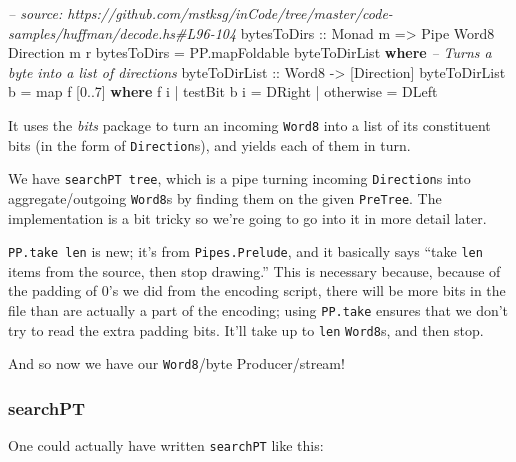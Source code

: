 \documentclass[]{article}
\newenvironment{Shaded}{}{}
\newcommand{\KeywordTok}[1]{\textcolor[rgb]{0.00,0.44,0.13}{\textbf{{#1}}}}
\newcommand{\DataTypeTok}[1]{\textcolor[rgb]{0.56,0.13,0.00}{{#1}}}
\newcommand{\DecValTok}[1]{\textcolor[rgb]{0.25,0.63,0.44}{{#1}}}
\newcommand{\CommentTok}[1]{\textcolor[rgb]{0.38,0.63,0.69}{\textit{{#1}}}}
\newcommand{\OtherTok}[1]{\textcolor[rgb]{0.00,0.44,0.13}{{#1}}}
\newcommand{\FunctionTok}[1]{\textcolor[rgb]{0.02,0.16,0.49}{{#1}}}
\newcommand{\NormalTok}[1]{{#1}}
\begin{document}
\begin{Shaded}
\begin{Highlighting}[]
\CommentTok{-- source: https://github.com/mstksg/inCode/tree/master/code-samples/huffman/decode.hs#L96-104}
\OtherTok{bytesToDirs ::} \DataTypeTok{Monad} \NormalTok{m }\OtherTok{=>} \DataTypeTok{Pipe} \DataTypeTok{Word8} \DataTypeTok{Direction} \NormalTok{m r}
\NormalTok{bytesToDirs }\FunctionTok{=} \NormalTok{PP.mapFoldable byteToDirList}
  \KeywordTok{where}
    \CommentTok{-- Turns a byte into a list of directions}
\OtherTok{    byteToDirList ::} \DataTypeTok{Word8} \OtherTok{->} \NormalTok{[}\DataTypeTok{Direction}\NormalTok{]}
    \NormalTok{byteToDirList b }\FunctionTok{=} \NormalTok{map f [}\DecValTok{0}\FunctionTok{..}\DecValTok{7}\NormalTok{]}
      \KeywordTok{where}
        \NormalTok{f i }\FunctionTok{|} \NormalTok{testBit b i }\FunctionTok{=} \DataTypeTok{DRight}
            \FunctionTok{|} \NormalTok{otherwise   }\FunctionTok{=} \DataTypeTok{DLeft}
\end{Highlighting}
\end{Shaded}

It uses the \emph{bits} package to turn an incoming \texttt{Word8} into a list
of its constituent bits (in the form of \texttt{Direction}s), and yields each of
them in turn.

We have \texttt{searchPT\ tree}, which is a pipe turning incoming
\texttt{Direction}s into aggregate/outgoing \texttt{Word8}s by finding them on
the given \texttt{PreTree}. The implementation is a bit tricky so we're going to
go into it in more detail later.

\texttt{PP.take\ len} is new; it's from \texttt{Pipes.Prelude}, and it basically
says ``take \texttt{len} items from the source, then stop drawing.'' This is
necessary because, because of the padding of 0's we did from the encoding
script, there will be more bits in the file than are actually a part of the
encoding; using \texttt{PP.take} ensures that we don't try to read the extra
padding bits. It'll take up to \texttt{len} \texttt{Word8}s, and then stop.

And so now we have our \texttt{Word8}/byte Producer/stream!

\subsubsection{searchPT}\label{searchpt}

One could actually have written \texttt{searchPT} like this:
\end{document}
